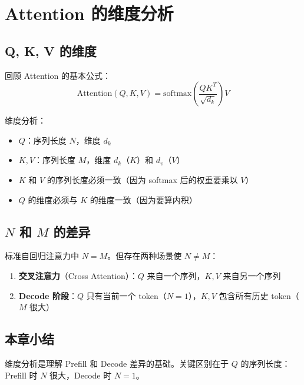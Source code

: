 \section{Attention 的维度分析}

\subsection{Q, K, V 的维度}

回顾 Attention 的基本公式：
$$
\text{Attention}(Q, K, V) = \text{softmax}\left(\frac{QK^T}{\sqrt{d_k}}\right) V
$$

维度分析：
\begin{itemize}
  \item $Q$：序列长度 $N$，维度 $d_k$
  \item $K, V$：序列长度 $M$，维度 $d_k$（$K$）和 $d_v$（$V$）
  \item $K$ 和 $V$ 的序列长度必须一致（因为 softmax 后的权重要乘以 $V$）
  \item $Q$ 的维度必须与 $K$ 的维度一致（因为要算内积）
\end{itemize}

\subsection{$N$ 和 $M$ 的差异}

标准自回归注意力中 $N = M$。但存在两种场景使 $N \neq M$：
\begin{enumerate}
  \item \textbf{交叉注意力}（Cross Attention）：$Q$ 来自一个序列，$K, V$ 来自另一个序列
  \item \textbf{Decode 阶段}：$Q$ 只有当前一个 token（$N=1$），$K, V$ 包含所有历史 token（$M$ 很大）
\end{enumerate}

\subsection{本章小结}

维度分析是理解 Prefill 和 Decode 差异的基础。关键区别在于 $Q$ 的序列长度：Prefill 时 $N$ 很大，Decode 时 $N = 1$。


